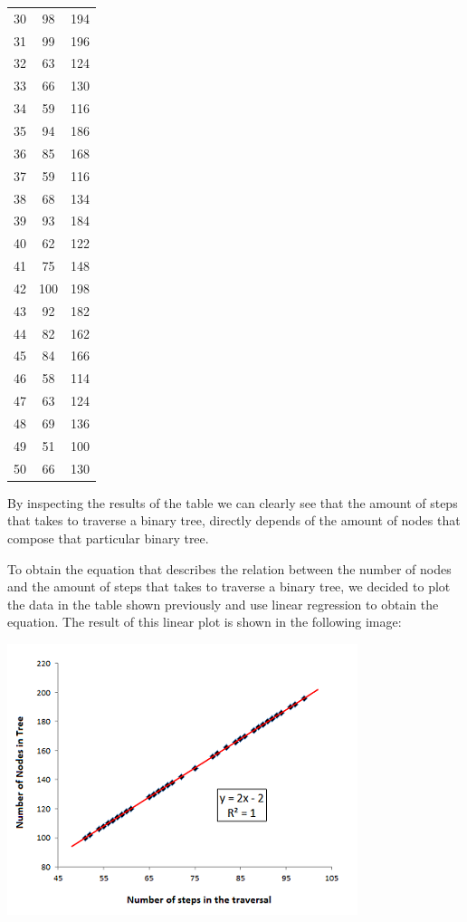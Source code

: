 \documentclass[12p]{report}
\begin{document}
\begin{table}[ht]
\begin{tabular}{c c c}
30 & 98 & 194 \\
31 & 99 & 196 \\
32 & 63 & 124 \\
33 & 66 & 130 \\
34 & 59 & 116 \\
35 & 94 & 186 \\
36 & 85 & 168 \\
37 & 59 & 116 \\
38 & 68 & 134 \\
39 & 93 & 184 \\
40 & 62 & 122 \\
41 & 75 & 148 \\
42 & 100 & 198 \\
43 & 92 & 182 \\
44 & 82 & 162 \\
45 & 84 & 166 \\
46 & 58 & 114 \\
47 & 63 & 124 \\
48 & 69 & 136 \\
49 & 51 & 100 \\
50 & 66 & 130 \\ 
\hline %
\end{tabular}

\label{table:nonlin} %
\end{table}

  \newpage 				%

\large By inspecting the results of the table we can clearly see that the amount of steps that takes to traverse a binary tree, directly depends of the amount of nodes that compose that particular binary tree. 

\bigskip

To obtain the equation that describes the relation between the number of nodes and the amount of steps that takes to traverse a binary tree, we decided to plot the data in the table shown previously and use linear regression to obtain the equation. The result of this linear plot is shown in the following image:


\includegraphics{Graph2}
\end{document}
